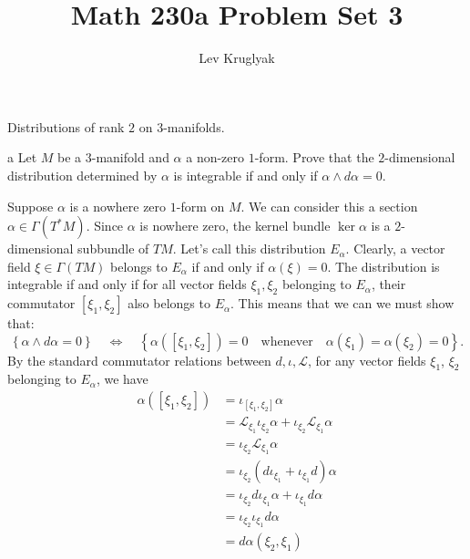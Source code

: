 \documentclass{../../templates/lkx_pset}
\title{Math 230a Problem Set 3}
\author{Lev Kruglyak}
\begin{document}
\maketitle

\begin{problem}{1}
Distributions of rank $2$ on $3$-manifolds.
\end{problem}

\begin{parts}
	\begin{part}{a}
		Let $M$ be a $3$-manifold and $\alpha$ a non-zero $1$-form. Prove that the $2$-dimensional distribution determined by $\alpha$ is integrable if and only if $\alpha\wedge d\alpha = 0$.
	\end{part}

	Suppose $\alpha$ is a nowhere zero $1$-form on $M$. We can consider this a section $\alpha\in\Gamma(T^*M)$. Since $\alpha$ is nowhere zero, the kernel bundle $\ker\alpha$ is a $2$-dimensional subbundle of $TM$. Let's call this distribution $E_\alpha$. Clearly, a vector field $\xi\in \Gamma(TM)$ belongs to $E_\alpha$ if and only if $\alpha(\xi) = 0$. The distribution is integrable if and only if for all vector fields $\xi_1,\xi_2$ belonging to $E_\alpha$, their commutator $[\xi_1,\xi_2]$ also belongs to $E_\alpha$. This means that we can we must show that:
	\[
		\left\{\alpha\wedge d\alpha = 0\right\}  \quad\iff\quad \left\{
		\alpha([\xi_1, \xi_2]) =0
		\quad\textrm{whenever}\quad\alpha(\xi_1) = \alpha(\xi_2)=0\right\}.
	\]
	By the standard commutator relations between $d,\iota,\mathcal{L}$, for any vector fields $\xi_1$, $\xi_2$ belonging to $E_\alpha$, we have
	\[
		\begin{aligned}
			\alpha([\xi_1, \xi_2])
			 & = \iota_{[\xi_1, \xi_2]}\alpha                                                    \\
			 & = \mathcal{L}_{\xi_1}\iota_{\xi_2}\alpha + \iota_{\xi_2}\mathcal{L}_{\xi_1}\alpha \\
			 & = \iota_{\xi_2}\mathcal{L}_{\xi_1}\alpha                                          \\
			 & = \iota_{\xi_2}(d\iota_{\xi_1} + \iota_{\xi_1} d)\alpha                           \\
			 & = \iota_{\xi_2}d\iota_{\xi_1}\alpha + \iota_{\xi_1} d\alpha                       \\
			 & = \iota_{\xi_2}\iota_{\xi_1} d\alpha                                              \\
			 & = d\alpha(\xi_2, \xi_1)
		\end{aligned}
\]
\end{parts}
\end{document}
